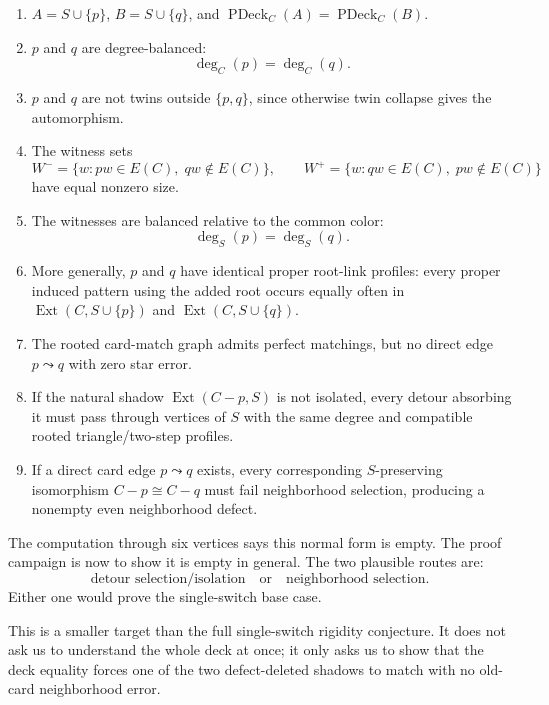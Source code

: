 \documentclass[11pt]{article}
\newcommand{\PDeck}{\operatorname{PDeck}}
\newcommand{\Ext}{\operatorname{Ext}}
\begin{document}
\begin{enumerate}[leftmargin=2em]
  \item \(A=S\cup\{p\}\), \(B=S\cup\{q\}\), and
  \(\PDeck_C(A)=\PDeck_C(B)\).

  \item \(p\) and \(q\) are degree-balanced:
  \[
    \deg_C(p)=\deg_C(q).
  \]

  \item \(p\) and \(q\) are not twins outside \(\{p,q\}\), since otherwise
  twin collapse gives the automorphism.

  \item The witness sets
  \[
    W^-=\{w:pw\in E(C),\;qw\notin E(C)\},
    \qquad
    W^+=\{w:qw\in E(C),\;pw\notin E(C)\}
  \]
  have equal nonzero size.

  \item The witnesses are balanced relative to the common color:
  \[
    \deg_S(p)=\deg_S(q).
  \]

  \item More generally, \(p\) and \(q\) have identical proper root-link
  profiles: every proper induced pattern using the added root occurs equally
  often in \(\Ext(C,S\cup\{p\})\) and \(\Ext(C,S\cup\{q\})\).

  \item The rooted card-match graph admits perfect matchings, but no direct
  edge \(p\leadsto q\) with zero star error.

  \item If the natural shadow \(\Ext(C-p,S)\) is not isolated, every detour
  absorbing it must pass through vertices of \(S\) with the same degree and
  compatible rooted triangle/two-step profiles.

  \item If a direct card edge \(p\leadsto q\) exists, every corresponding
  \(S\)-preserving isomorphism \(C-p\cong C-q\) must fail neighborhood
  selection, producing a nonempty even neighborhood defect.
\end{enumerate}

The computation through six vertices says this normal form is empty.  The
proof campaign is now to show it is empty in general.  The two plausible
routes are:
\[
  \text{detour selection/isolation}
  \quad\text{or}\quad
  \text{neighborhood selection}.
\]
Either one would prove the single-switch base case.

This is a smaller target than the full single-switch rigidity conjecture.  It
does not ask us to understand the whole deck at once; it only asks us to show
that the deck equality forces one of the two defect-deleted shadows to match
with no old-card neighborhood error.
\end{document}
